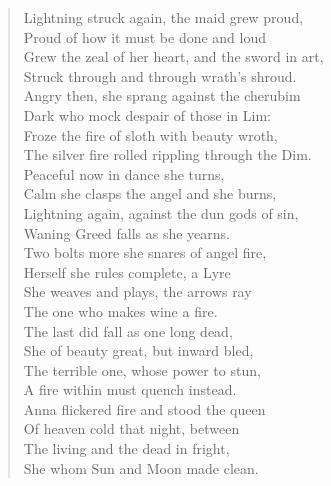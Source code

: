 \begin{verse}
Lightning struck again, the maid grew proud,\\
Proud of how it must be done and loud\\
Grew the zeal of her heart, and the sword in art,\\
Struck through and through wrath's shroud.\\
Angry then, she sprang against the cherubim\\
Dark who mock despair of those in Lim:\\
Froze the fire of sloth with beauty wroth,\\
The silver fire rolled rippling through the Dim.\\
Peaceful now in dance she turns,\\
Calm she clasps the angel and she burns,\\
Lightning again, against the dun gods of sin,\\
Waning Greed falls as she yearns.\\
Two bolts more she snares of angel fire,\\
Herself she rules complete, a Lyre\\
She weaves and plays, the arrows ray\\
The one who makes wine a fire.\\
The last did fall as one long dead,\\
She of beauty great, but inward bled,\\
The terrible one, whose power to stun,\\
A fire within must quench instead.\\
Anna flickered fire and stood the queen\\
Of heaven cold that night, between\\
The living and the dead in fright,\\
She whom Sun and Moon made clean.
\end{verse}


